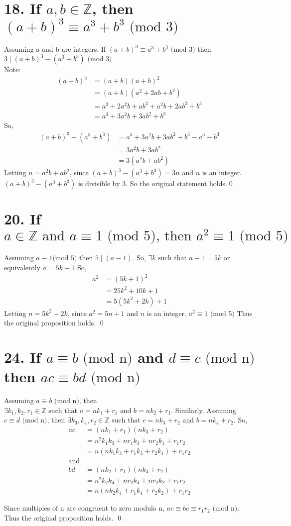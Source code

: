 \documentclass{article}
\newcommand{\ints}{\mathbb{Z}}
\newcommand{\st}{\text{ such that }}
\begin{document}
	\section*{18. If $a,b \in \ints$, then $(a+b)^3 \equiv a^3 +b^3 \text{ (mod 3)}$ }
	Assuming a and b are integers.
	If $(a+b)^3 \equiv a^3 +b^3 \text{ (mod 3)}$ then $3 \mid (a+b)^3 - (a^3 +b^3 )\text{ (mod 3)}$ \\
	Note: 
	\begin{align*}
		(a+b)^3 &= (a+b)(a+b)^2 \\
		&= (a+b)(a^2 + 2ab + b^2)\\
		&= a^3 + 2a^2b + ab^2 + a^2b + 2ab^2 + b^3 \\
		&= a^3 + 3a^2b + 3ab^2 + b^3
	\end{align*}
	So, 
	\begin{align*}
		(a+b)^3 - (a^3 + b^3) &= a^3 + 3a^2b + 3ab^2 + b^3 -a^3 - b^3\\
		&= 3a^2b + 3ab^2 \\
		&= 3(a^2b + ab^2)
	\end{align*}
	Letting $n = a^2b + ab^2$, since $(a+b)^3 - (a^3 + b^3)= 3n$ and $n$ is an integer. $(a+b)^3 - (a^3 + b^3)$ is divisible by 3. So the original statement holds.\qed
	
	
	\section*{20. If $a \in \ints \text{ and } a \equiv 1 \text{ (mod 5), then } a^2 \equiv 1 \text{ (mod 5)}$  }
	Assuming $a \equiv 1 \text{(mod 5)}$ then $5 \mid (a-1)$. So, $\exists k \st  a - 1 = 5k$ or equivalently $a = 5k + 1$ 
	So, 
	\begin{align*}
		a^2 &= (5k+1)^2\\
			&= 25k^2+10k + 1\\
			&=  5(5k^2+2k)+1
	\end{align*}
	Letting $n = 5k^2+2k$, since $a^2 = 5n+1$ and $n$ is an integer. $a^2 \equiv 1 \text{ (mod 5)}$ Thus the original proposition holds. \qed
	
	
	\section*{ 24. If $ a \equiv b \text{ (mod n)} $ and $ d \equiv c \text{ (mod n)} $ then $ ac \equiv bd \text{ (mod n)} $}
		Assuming $ a \equiv b \text{ (mod n)} $,  then $\exists k_1, k_2, r_1 \in \ints \st a = nk_1 +r_1 \text{ and } b = nk_2 +r_1 $. 
		Similarly, Assuming $ c \equiv d \text{ (mod n)} $, then $\exists k_3, k_4, r_2 \in \ints \st c = nk_3 +r_2 \text{ and } b = nk_4 +r_2 $.
	 	So, 
	 	\begin{align*}
	 		ac &= (nk_1+r_1)(nk_3+r_2)\\
	 		   &= n^2k_1k_3 + nr_1k_3 + nr_2k_1 + r_1r_2\\
	 		   &= n(nk_1k_3 + r_1k_3 + r_2k_1) + r_1r_2 \\
	 		\text{and}\\
	 		bd &= (nk_2+r_1)(nk_4+r_2)\\
	 		   &= n^2k_2k_4 + nr_2k_4 + nr_2k_2 + r_1r_2\\
	 		   &= n(nk_2k_4 + r_1k_4 + r_2k_2) + r_1r_2 
	 	\end{align*}
	 	
	 	Since multiples of n are congruent to zero modulo n, $ac \equiv bc \equiv r_1r_2 \text{ (mod n)}$. Thus the original proposition holds. \qed
	 	
	 	
	 	
	
	
	
\end{document}
